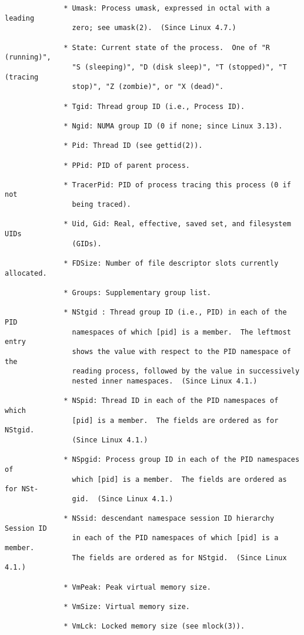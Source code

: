 \documentclass[]{article}
\begin{document}
\begin{verbatim}
              * Umask: Process umask, expressed in octal with a leading
                zero; see umask(2).  (Since Linux 4.7.)

              * State: Current state of the process.  One of "R (running)",
                "S (sleeping)", "D (disk sleep)", "T (stopped)", "T (tracing
                stop)", "Z (zombie)", or "X (dead)".

              * Tgid: Thread group ID (i.e., Process ID).

              * Ngid: NUMA group ID (0 if none; since Linux 3.13).

              * Pid: Thread ID (see gettid(2)).

              * PPid: PID of parent process.

              * TracerPid: PID of process tracing this process (0 if not
                being traced).

              * Uid, Gid: Real, effective, saved set, and filesystem UIDs
                (GIDs).

              * FDSize: Number of file descriptor slots currently allocated.

              * Groups: Supplementary group list.

              * NStgid : Thread group ID (i.e., PID) in each of the PID
                namespaces of which [pid] is a member.  The leftmost entry
                shows the value with respect to the PID namespace of the
                reading process, followed by the value in successively
                nested inner namespaces.  (Since Linux 4.1.)

              * NSpid: Thread ID in each of the PID namespaces of which
                [pid] is a member.  The fields are ordered as for NStgid.
                (Since Linux 4.1.)

              * NSpgid: Process group ID in each of the PID namespaces of
                which [pid] is a member.  The fields are ordered as for NSt‐
                gid.  (Since Linux 4.1.)

              * NSsid: descendant namespace session ID hierarchy Session ID
                in each of the PID namespaces of which [pid] is a member.
                The fields are ordered as for NStgid.  (Since Linux 4.1.)

              * VmPeak: Peak virtual memory size.

              * VmSize: Virtual memory size.

              * VmLck: Locked memory size (see mlock(3)).


\end{verbatim}
\end{document}
